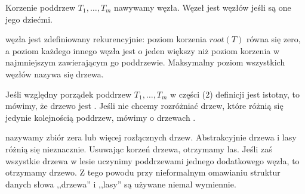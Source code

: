 Korzenie poddrzew $T_{1},\ldots, T_{m}$ nawywamy   węzła.
Węzeł jest   węzłów jeśli są one jego dziećmi.



  węzła jest zdefiniowany rekurencyjnie: poziom korzenia $root(T)$ równa się zero,
a poziom każdego innego węzła jest o jeden większy niż poziom korzenia w najmniejszym 
 zawierającym go poddrzewie.
Maksymalny poziom wszystkich węzłów nazywa się   drzewa.
%
%







Jeśli względny porządek poddrzew $T_{1},\ldots, T_{m}$ w części (2) definicji jest istotny,
to mówimy, że drzewo jest  . 
Jeśli nie chcemy rozróżniać drzew, które różnią się jedynie kolejnością poddrzew, mówimy o drzewach .

  nazywamy zbiór zera lub więcej rozłącznych drzew. 
Abstrakcyjnie drzewa i lasy różnią się nieznacznie.
Usuwając korzeń drzewa, otrzymamy las.
Jeśli zaś wszystkie drzewa w lesie uczynimy poddrzewami jednego dodatkowego węzła, to otrzymamy drzewo.
Z tego powodu przy nieformalnym omawianiu struktur danych słowa ,,drzewa'' i ,,lasy'' są używane niemal wymiennie.


